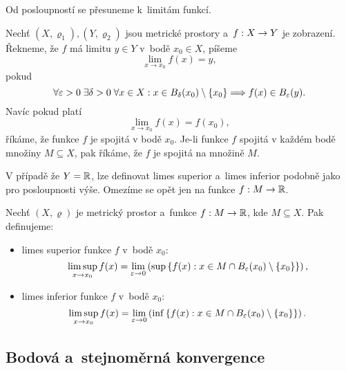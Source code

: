 Od posloupností se přesuneme k~limitám funkcí.
\begin{definition}\label{def:limita-fce-v-bode}
    Nechť $(X,\varrho_1),(Y,\varrho_2)$ jsou metrické prostory a~$f:X \rightarrow Y$ je zobrazení. Řekneme, že $f$ má limitu $y\in Y$ v~bodě $x_0\in X$, píšeme
    \[\lim_{x\to x_0}f(x)=y,\]
    pokud
    \[\forall \varepsilon >0\;\exists \delta >0\;\forall x\in X: x\in B_\delta(x_0)\setminus\left\{x_0\right\}\Longrightarrow f(x)\in B_\varepsilon(y).\]
    Navíc pokud platí
    \[\lim_{x\to x_0}f(x)=f(x_0),\]
    říkáme, že funkce $f$ je spojitá v bodě $x_0$. Je-li funkce $f$ spojitá v každém bodě množiny $M\subseteq X$, pak říkáme, že $f$ je spojitá na množině $M$.
\end{definition}
V případě že $Y=\mathbb{R}$, lze definovat limes superior a~limes inferior podobně jako pro posloupnosti výše. Omezíme se opět jen na funkce $f:M \rightarrow \mathbb{R}$.
\begin{definition}\label{def:limsup-liminf-funkce}
    Nechť $(X,\varrho)$ je metrický prostor a~funkce $f:M \rightarrow \mathbb{R}$, kde $M\subseteq X$. Pak definujeme:
    \begin{itemize}
        \item limes superior funkce $f$ v~bodě $x_0$:
        \[\limsup _{x\to x_0}f(x)=\lim _{\varepsilon \to 0}\left(\sup\left\{f(x):x\in M\cap B_\varepsilon(x_0)\setminus \{x_0\}\right\}\right),\]
        \item limes inferior funkce $f$ v~bodě $x_0$:
        \[\limsup _{x\to x_0}f(x)=\lim _{\varepsilon \to 0}\left(\inf\left\{f(x):x\in M\cap B_\varepsilon(x_0)\setminus \{x_0\}\right\}\right).\]
    \end{itemize}
\end{definition}

\subsection{Bodová a~stejnoměrná konvergence}\label{subsec:bodova-stejnomerna-konvergence}

